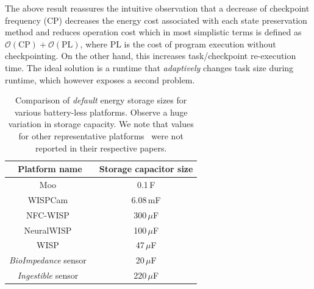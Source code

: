 The above result reassures the intuitive observation that a decrease of checkpoint frequency (CP) decreases the energy cost associated with each state preservation method and reduces operation cost which in most simplistic terms is defined as $\mathcal{O}(\text{CP})+\mathcal{O}(\text{PL})$, where PL is the cost of program execution without checkpointing. On the other hand, this increases task/checkpoint re-execution time. The ideal solution is a runtime that \emph{adaptively} changes task size during runtime, which however exposes a second problem.

\begin{table}
	\centering
	\footnotesize
	\begin{tabular}{|c|c|}
		\hline
		Platform name & Storage capacitor size \\
		\hline \hline
		Moo~\cite{moo} & 0.1\,F \\
		WISPCam~\cite{naderiparizi_rfid_2015} & 6.08\,mF \\ %
		NFC-WISP~\cite{zhao_rfid_2015} & 300\,$\mu$F \\
		NeuralWISP~\cite{holleman_biocas_2008} & 100\,$\mu$F \\
		WISP~\cite{wisp5} & 47\,$\mu$F \\
		{\em BioImpedance} sensor~\cite{rodriguez_tbcs_2015} & 20\,$\mu$F \\
		{\em Ingestible} sensor~\cite{nadeau_naturebio_2017} & 220\,$\mu$F\\
		\hline
	\end{tabular} 
	\caption{Comparison of {\em default} energy storage sizes for various battery-less platforms. Observe a huge variation in storage capacity. We note that values for other representative platforms~\cite{medusa_farsens_2017,talla_imwut_2017,liu_sigcomm_2013,parks_sigcomm_2014} were not reported in their respective papers.}
	\label{table:capacitor}
\end{table}

